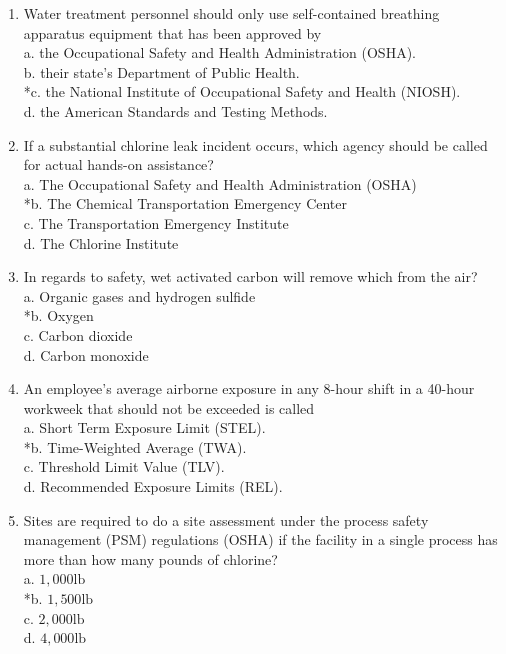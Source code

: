 \begin{enumerate}[1.]
  \item Water treatment personnel should only use self-contained breathing apparatus equipment that has been approved by\\
a. the Occupational Safety and Health Administration (OSHA).\\
b. their state's Department of Public Health.\\
*c. the National Institute of Occupational Safety and Health (NIOSH).\\
d. the American Standards and Testing Methods.\\
  \item If a substantial chlorine leak incident occurs, which agency should be called for actual hands-on assistance?\\
a. The Occupational Safety and Health Administration (OSHA)\\
*b. The Chemical Transportation Emergency Center\\
c. The Transportation Emergency Institute\\
d. The Chlorine Institute\\
  \item In regards to safety, wet activated carbon will remove which from the air?\\
a. Organic gases and hydrogen sulfide\\
*b. Oxygen\\
c. Carbon dioxide\\
d. Carbon monoxide\\
  \item An employee's average airborne exposure in any 8-hour shift in a 40-hour workweek that should not be exceeded is called\\
a. Short Term Exposure Limit (STEL).\\
*b. Time-Weighted Average (TWA).\\
c. Threshold Limit Value (TLV).\\
d. Recommended Exposure Limits (REL).\\
  \item Sites are required to do a site assessment under the process safety management (PSM) regulations (OSHA) if the facility in a single process has more than how many pounds of chlorine?\\
a. $1,000 \mathrm{lb}$\\
*b. $1,500 \mathrm{lb}$\\
c. $2,000 \mathrm{lb}$\\
d. $4,000 \mathrm{lb}$\\


\end{enumerate}
